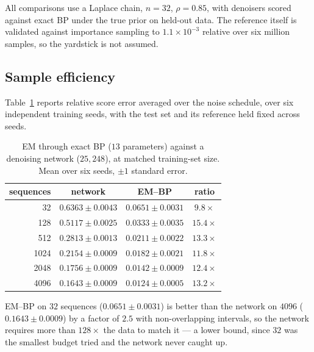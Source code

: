 \documentclass{article}
\begin{document}
All comparisons use a Laplace chain, $n=32$, $\rho=0.85$, with denoisers scored against exact
BP under the true prior on held-out data. The reference itself is validated against
importance sampling to $1.1\times10^{-3}$ relative over six million samples, so the yardstick
is not assumed.

\subsection{Sample efficiency}

Table~\ref{tab:main} reports relative score error averaged over the noise schedule, over six
independent training seeds, with the test set and its reference held fixed across seeds.

\begin{table}[t]
\caption{EM through exact BP ($13$ parameters) against a denoising network ($25{,}248$),
at matched training-set size. Mean over six seeds, $\pm 1$ standard error.}
\label{tab:main}
\centering
\begin{tabular}{rccc}
\toprule
sequences & network & EM--BP & ratio \\
\midrule
32   & $0.6363 \pm 0.0043$ & $\mathbf{0.0651 \pm 0.0031}$ & $9.8\times$ \\
128  & $0.5117 \pm 0.0025$ & $\mathbf{0.0333 \pm 0.0035}$ & $15.4\times$ \\
512  & $0.2813 \pm 0.0013$ & $\mathbf{0.0211 \pm 0.0022}$ & $13.3\times$ \\
1024 & $0.2154 \pm 0.0009$ & $\mathbf{0.0182 \pm 0.0021}$ & $11.8\times$ \\
2048 & $0.1756 \pm 0.0009$ & $\mathbf{0.0142 \pm 0.0009}$ & $12.4\times$ \\
4096 & $0.1643 \pm 0.0009$ & $\mathbf{0.0124 \pm 0.0005}$ & $13.2\times$ \\
\bottomrule
\end{tabular}
\end{table}

EM--BP on $32$ sequences ($0.0651 \pm 0.0031$) is better than the network on $4096$
($0.1643 \pm 0.0009$) by a factor of $2.5$ with non-overlapping intervals, so the network
requires more than $128\times$ the data to match it --- a lower bound, since $32$ was the
smallest budget tried and the network never caught up.
\end{document}
